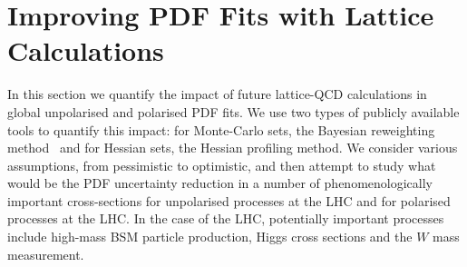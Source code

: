 \section{Improving PDF Fits with Lattice Calculations}
\label{sec:projections}

In this section we quantify the impact of future lattice-QCD calculations
in global unpolarised and polarised PDF fits.
%
We use two types of publicly available tools to quantify this
impact: for Monte-Carlo sets, the Bayesian reweighting
method~\cite{Ball:2011gg,Ball:2010gb} and for Hessian sets,
the Hessian profiling method.
%
We consider various assumptions, from pessimistic to optimistic,
and then attempt to study what would be the PDF uncertainty
reduction in a number of phenomenologically
important cross-sections for unpolarised processes at the
LHC and for polarised processes at the LHC.
%
In the case of the LHC, potentially important processes include
high-mass BSM particle production, Higgs cross sections and
the $W$ mass measurement.

